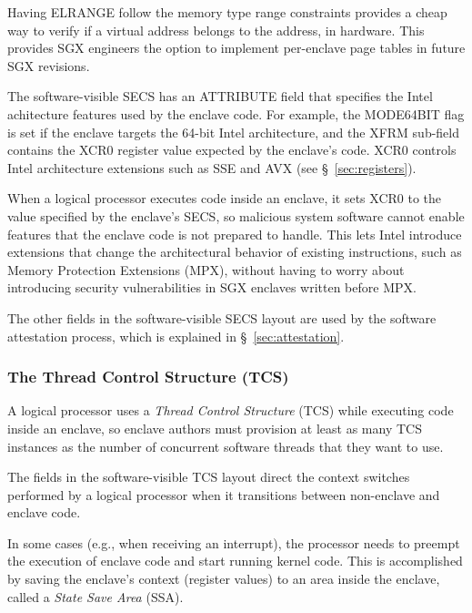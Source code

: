 Having ELRANGE follow the memory type range constraints provides a cheap way to
verify if a virtual address belongs to the address, in hardware. This provides
SGX engineers the option to implement per-enclave page tables in future SGX
revisions.


The software-visible SECS has an ATTRIBUTE field that specifies the Intel
achitecture features used by the enclave code. For example, the MODE64BIT flag
is set if the enclave targets the 64-bit Intel architecture, and the XFRM
sub-field contains the XCR0 register value expected by the enclave's code. XCR0
controls Intel architecture extensions such as SSE and AVX (see
\S~\ref{sec:registers}).

When a logical processor executes code inside an enclave, it sets XCR0 to the
value specified by the enclave's SECS, so malicious system software cannot
enable features that the enclave code is not prepared to handle. This lets
Intel introduce extensions that change the architectural behavior of existing
instructions, such as Memory Protection Extensions (MPX), without having to
worry about introducing security vulnerabilities in SGX enclaves written before
MPX.

The other fields in the software-visible SECS layout are used by the
software attestation process, which is explained in \S~\ref{sec:attestation}.


\subsubsection{The Thread Control Structure (TCS)}
\label{sec:tcs}


A logical processor uses a \textit{Thread Control Structure} (TCS) while
executing code inside an enclave, so enclave authors must provision at least as
many TCS instances as the number of concurrent software threads that they want
to use.

The fields in the software-visible TCS layout direct the context switches
performed by a logical processor when it transitions between non-enclave and
enclave code.


In some cases (e.g., when receiving an interrupt), the processor needs to
preempt the execution of enclave code and start running kernel code. This is
accomplished by saving the enclave's context (register values) to an area
inside the enclave, called a \textit{State Save Area} (SSA).

